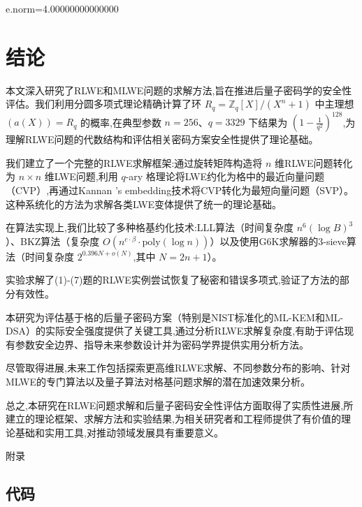\documentclass[12pt,a4paper]{article}
\numberwithin{equation}{section}
\begin{document}
e.norm=4.00000000000000

\section{结论}

本文深入研究了RLWE和MLWE问题的求解方法,旨在推进后量子密码学的安全性评估。我们利用分圆多项式理论精确计算了环 $R_q = \mathbb{Z}_q[X]/(X^n + 1)$ 中主理想 $(a(X)) = R_q$ 的概率,在典型参数 $n = 256$、$q = 3329$ 下结果为 $(1-\frac{1}{q^2})^{128}$,为理解RLWE问题的代数结构和评估相关密码方案安全性提供了理论基础。

我们建立了一个完整的RLWE求解框架:通过旋转矩阵构造将 $n$ 维RLWE问题转化为 $n \times n$ 维LWE问题,利用 $q$-ary 格理论将LWE约化为格中的最近向量问题（CVP）,再通过Kannan 's embedding技术将CVP转化为最短向量问题（SVP）。这种系统化的方法为求解各类LWE变体提供了统一的理论基础。

在算法实现上,我们比较了多种格基约化技术:LLL算法（时间复杂度 $n^6 (\log B)^3$）、BKZ算法（复杂度 $O(n^{c \cdot \beta} \cdot \text{poly}(\log n))$）以及使用G6K求解器的3-sieve算法（时间复杂度 $2^{0.396N+o(N)}$,其中 $N=2n+1$）。

实验求解了(1)-(7)题的RLWE实例尝试恢复了秘密和错误多项式,验证了方法的部分有效性。

本研究为评估基于格的后量子密码方案（特别是NIST标准化的ML-KEM和ML-DSA）的实际安全强度提供了关键工具,通过分析RLWE求解复杂度,有助于评估现有参数安全边界、指导未来参数设计并为密码学界提供实用分析方法。

尽管取得进展,未来工作包括探索更高维RLWE求解、不同参数分布的影响、针对MLWE的专门算法以及量子算法对格基问题求解的潜在加速效果分析。

总之,本研究在RLWE问题求解和后量子密码安全性评估方面取得了实质性进展,所建立的理论框架、求解方法和实验结果,为相关研究者和工程师提供了有价值的理论基础和实用工具,对推动领域发展具有重要意义。

\hspace*{\fill}

{\centering\heiti\fontsize{14pt}{21pt}\selectfont 附录\par}
\vspace{1em}

\subsection{代码}
\end{document}

